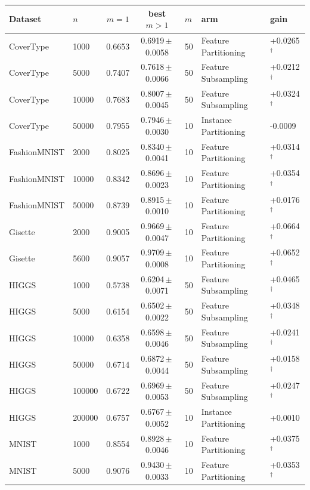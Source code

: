 \begin{table}[ht]
\centering\small
\begin{tabular}{llcclll}
\toprule
Dataset & $n$ & $m{=}1$ & best $m{>}1$ & $m$ & arm & gain \\
\midrule
CoverType & 1000 & 0.6653 & 0.6919\,$\pm$\,0.0058 & 50 & Feature Partitioning & +0.0265$^\dagger$ \\
CoverType & 5000 & 0.7407 & 0.7618\,$\pm$\,0.0066 & 50 & Feature Subsampling & +0.0212$^\dagger$ \\
CoverType & 10000 & 0.7683 & 0.8007\,$\pm$\,0.0045 & 50 & Feature Subsampling & +0.0324$^\dagger$ \\
CoverType & 50000 & 0.7955 & 0.7946\,$\pm$\,0.0030 & 10 & Instance Partitioning & -0.0009 \\
FashionMNIST & 2000 & 0.8025 & 0.8340\,$\pm$\,0.0041 & 10 & Feature Partitioning & +0.0314$^\dagger$ \\
FashionMNIST & 10000 & 0.8342 & 0.8696\,$\pm$\,0.0023 & 10 & Feature Partitioning & +0.0354$^\dagger$ \\
FashionMNIST & 50000 & 0.8739 & 0.8915\,$\pm$\,0.0010 & 10 & Feature Partitioning & +0.0176$^\dagger$ \\
Gisette & 2000 & 0.9005 & 0.9669\,$\pm$\,0.0047 & 10 & Feature Partitioning & +0.0664$^\dagger$ \\
Gisette & 5600 & 0.9057 & 0.9709\,$\pm$\,0.0008 & 10 & Feature Partitioning & +0.0652$^\dagger$ \\
HIGGS & 1000 & 0.5738 & 0.6204\,$\pm$\,0.0071 & 50 & Feature Subsampling & +0.0465$^\dagger$ \\
HIGGS & 5000 & 0.6154 & 0.6502\,$\pm$\,0.0022 & 50 & Feature Subsampling & +0.0348$^\dagger$ \\
HIGGS & 10000 & 0.6358 & 0.6598\,$\pm$\,0.0046 & 50 & Feature Subsampling & +0.0241$^\dagger$ \\
HIGGS & 50000 & 0.6714 & 0.6872\,$\pm$\,0.0044 & 50 & Feature Subsampling & +0.0158$^\dagger$ \\
HIGGS & 100000 & 0.6722 & 0.6969\,$\pm$\,0.0053 & 50 & Feature Subsampling & +0.0247$^\dagger$ \\
HIGGS & 200000 & 0.6757 & 0.6767\,$\pm$\,0.0052 & 10 & Instance Partitioning & +0.0010 \\
MNIST & 1000 & 0.8554 & 0.8928\,$\pm$\,0.0046 & 10 & Feature Partitioning & +0.0375$^\dagger$ \\
MNIST & 5000 & 0.9076 & 0.9430\,$\pm$\,0.0033 & 10 & Feature Partitioning & +0.0353$^\dagger$ \\

\end{tabular}
\end{table}
